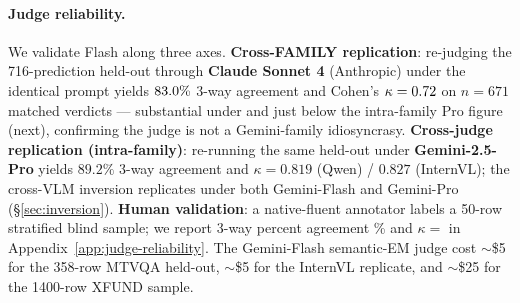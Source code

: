 \paragraph{Judge reliability.}
We validate Flash along three axes. \textbf{Cross-FAMILY replication}: re-judging the 716-prediction held-out through \textbf{Claude Sonnet 4} (Anthropic) under the identical prompt yields $83.0\%$ 3-way agreement and Cohen's $\kappa = 0.72$ on $n=671$ matched verdicts --- substantial under \citet{landis1977kappa} and just below the intra-family Pro figure (next), confirming the judge is not a Gemini-family idiosyncrasy. \textbf{Cross-judge replication (intra-family)}: re-running the same held-out under \textbf{Gemini-2.5-Pro} yields $89.2\%$ 3-way agreement and $\kappa = 0.819$ (Qwen) / $0.827$ (InternVL); the cross-VLM inversion replicates under both Gemini-Flash and Gemini-Pro (\S\ref{sec:inversion}). \textbf{Human validation}: a native-fluent annotator labels a 50-row stratified blind sample; we report 3-way percent agreement \hjpct\% and $\kappa = $\hjkappa{} in Appendix~\ref{app:judge-reliability}. The Gemini-Flash semantic-EM judge cost $\sim$\$5 for the 358-row MTVQA held-out, $\sim$\$5 for the InternVL replicate, and $\sim$\$25 for the 1400-row XFUND sample.
